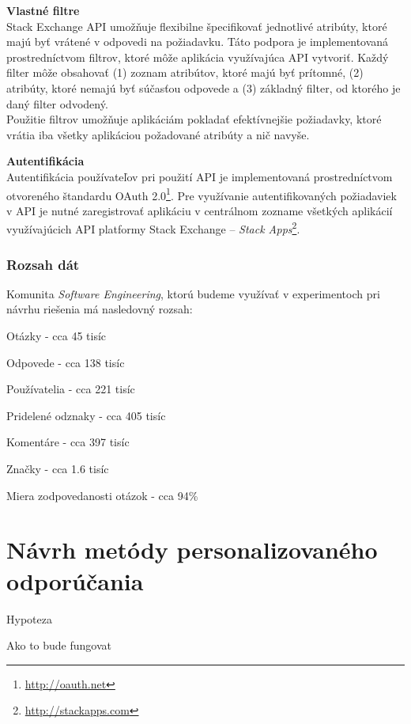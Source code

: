 \textbf{Vlastné filtre}\\
Stack Exchange API umožňuje flexibilne špecifikovať jednotlivé atribúty, ktoré majú byť vrátené v odpovedi na požiadavku.
Táto podpora je implementovaná prostredníctvom filtrov, ktoré môže aplikácia využívajúca API vytvoriť. Každý filter môže
obsahovať (1) zoznam atribútov, ktoré majú byť prítomné, (2) atribúty, ktoré nemajú byť súčasťou odpovede a (3) základný
filter, od ktorého je daný filter odvodený.\\
Použitie filtrov umožňuje aplikáciám pokladať efektívnejšie požiadavky, ktoré vrátia iba všetky aplikáciou požadované
atribúty a nič navyše.

\textbf{Autentifikácia}\\
Autentifikácia používateľov pri použití API je implementovaná prostredníctvom otvoreného štandardu
OAuth 2.0\footnote{\url{http://oauth.net}}. Pre využívanie autentifikovaných požiadaviek v API je nutné zaregistrovať
aplikáciu v centrálnom zozname všetkých aplikácií využívajúcich API platformy Stack Exchange --
\textit{Stack Apps}\footnote{\url{http://stackapps.com}}.

\subsubsection{Rozsah dát}

Komunita \textit{Software Engineering}, ktorú budeme využívať v experimentoch pri návrhu riešenia má nasledovný rozsah:

\begin{my_itemize}
    \item{Otázky - cca 45 tisíc}
    \item{Odpovede - cca 138 tisíc}
    \item{Používatelia - cca 221 tisíc}
    \item{Pridelené odznaky - cca 405 tisíc}
    \item{Komentáre - cca 397 tisíc}
    \item{Značky - cca 1.6 tisíc}
    \item{Miera zodpovedanosti otázok - cca 94\%}
\end{my_itemize}


\section{Návrh metódy personalizovaného odporúčania}

Hypoteza

Ako to bude fungovat

